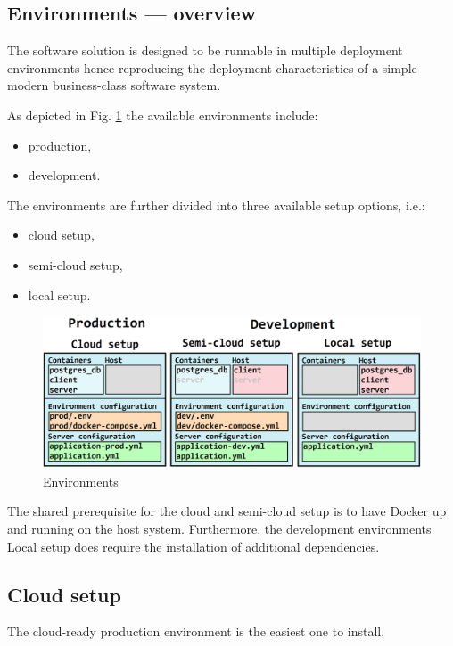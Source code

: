 \documentclass[a4paper,twoside,12pt]{book}
\begin{document}
\subsection{Environments — overview}

The software solution is designed to be runnable in multiple deployment environments hence reproducing the deployment characteristics of a simple modern business-class software system.

As depicted in Fig. \ref{fig:img:environments} the available environments include:
\begin{itemize}
\item production,
\item development.
\end{itemize}

The environments are further divided into three available setup options, i.e.:
\begin{itemize}
\item cloud setup,
\item semi-cloud setup,
\item local setup.
\end{itemize}

\begin{figure}[H]
  \centering
  \includegraphics[width=\linewidth]{img/environments.png}
  \caption{Environments}
  \label{fig:img:environments}
\end{figure}

The shared prerequisite for the cloud and semi-cloud setup is to have Docker up and running on the host system. Furthermore, the development environments Local setup does require the installation of additional dependencies.

\subsection{Cloud setup}

The cloud-ready production environment is the easiest one to install.
\end{document}
